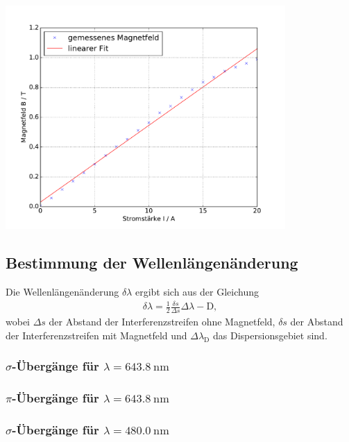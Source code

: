 \documentclass[captions=tableheading]{scrartcl}
\begin{document}
\begin{center}
	\includegraphics[width=0.8\textwidth]{images/magnetfeld.pdf}
	\label{fig:magnetfeld}
\end{center}

\subsection{Bestimmung der Wellenlängenänderung}
Die Wellenlängenänderung $\delta\lambda$ ergibt sich aus der Gleichung
\begin{align}
\delta\lambda=\frac{1}{2}\frac{\delta s}{\Delta s}\Delta\lambda-{\text{D}},
\end{align}
wobei $\Delta s$ der Abstand der Interferenzstreifen ohne Magnetfeld, $\delta s$ der Abstand der Interferenzstreifen mit Magnetfeld und $\Delta\lambda_{\text{D}}$ das Dispersionsgebiet sind.

\subsubsection{$\sigma$-Übergänge für $\lambda=\SI{643.8}{\nano\metre}$}

\subsubsection{$\pi$-Übergänge für $\lambda=\SI{643.8}{\nano\metre}$}

\subsubsection{$\sigma$-Übergänge für $\lambda=\SI{480.0}{\nano\metre}$}
\end{document}
